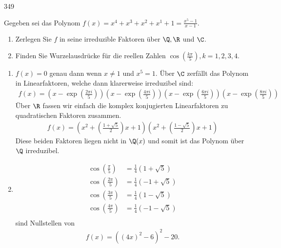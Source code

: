 \begin{algebraUE}{349}

Gegeben sei das Polynom $f(x) = x^4 + x^3 + x^2 +x^1 + 1 = \frac{x^5 - 1}{x - 1}.$
\begin{enumerate}
  \item Zerlegen Sie $f$ in seine irreduzible Faktoren über $\Q,\R$ und $\C$.
  \item Finden Sie Wurzelausdrücke für die reellen Zahlen $\cos(\frac{k\pi}{5}), k = 1,2,3,4$.
\end{enumerate}

\end{algebraUE}

\begin{solution}
\begin{enumerate}
  \item $f(x) = 0$ genau dann wenn $x \neq 1$ und $x^5 = 1$. Über $\C$ zerfällt das
  Polynom in Linearfaktoren, welche dann klarerweise irreduzibel sind:
  \begin{align*}
    f(x) = \left(x - \exp\left(\frac{2\pi i}{5}\right)\right)\left(x - \exp\left(\frac{4\pi i}{5}\right)\right)
    \left(x - \exp\left(\frac{6\pi i}{5}\right)\right)\left(x - \exp\left(\frac{8\pi i}{5}\right)\right)
  \end{align*}
  Über $\R$ fassen wir einfach die komplex konjugierten Linearfaktoren zu quadratischen
  Faktoren zusammen.
  \begin{align*}
    f(x) = \left(x^2 + \left(\frac{1 + \sqrt{5}}{2}\right)x + 1\right)\left(x^2 + \left(\frac{1 - \sqrt{5}}{2}\right)x + 1\right)
  \end{align*}
  Diese beiden Faktoren liegen nicht in $\Q(x)$ und somit ist das Polynom über $\Q$ irreduzibel.
  \item
  \begin{align*}
    \cos\left(\frac{\pi}{5}\right) &= \frac{1}{4}\left(1 + \sqrt{5}\right) \\
    \cos\left(\frac{2\pi}{5}\right) &= \frac{1}{4}\left(- 1 + \sqrt{5}\right) \\
    \cos\left(\frac{3\pi}{5}\right) &= \frac{1}{4}\left(1 - \sqrt{5}\right) \\
    \cos\left(\frac{4\pi}{5}\right) &= \frac{1}{4}\left(-1 - \sqrt{5}\right) \\
  \end{align*}
  sind Nullstellen von
  \begin{align*}
    f(x) = ((4x)^2 - 6)^2 - 20.
  \end{align*}
\end{enumerate}


\end{solution}
